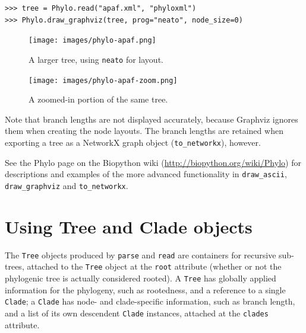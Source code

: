 \documentclass{report}
\begin{document}
\begin{verbatim}
>>> tree = Phylo.read("apaf.xml", "phyloxml")
>>> Phylo.draw_graphviz(tree, prog="neato", node_size=0)
\end{verbatim}

\begin{htmlonly}
\label{fig:phylo-apaf}

\label{fig:phylo-apaf-zoom}
\end{htmlonly}

\begin{latexonly}
  \begin{figure}[tbp]
    \centering
    \texttt{[image: images/phylo-apaf.png]} \\
    \caption{A larger tree, using {\tt neato} for layout.}
    \label{fig:phylo-apaf}
  \end{figure}
  \begin{figure}[btp]
    \centering
    \texttt{[image: images/phylo-apaf-zoom.png]}
    \caption{A zoomed-in portion of the same tree.}
    \label{fig:phylo-apaf-zoom}
  \end{figure}
\end{latexonly}

Note that branch lengths are not displayed accurately, because Graphviz ignores them when
creating the node layouts. The branch lengths are retained when exporting a tree as a NetworkX
graph object (\verb|to_networkx|), however.

See the Phylo page on the Biopython wiki (\url{http://biopython.org/wiki/Phylo}) for
descriptions and examples of the more advanced functionality in \verb|draw_ascii|,
\verb|draw_graphviz| and \verb|to_networkx|.


\section{Using Tree and Clade objects}

The \verb|Tree| objects produced by \verb|parse| and \verb|read| are containers for recursive
sub-trees, attached to the \verb|Tree| object at the \verb|root| attribute (whether or not the
phylogenic tree is actually considered rooted). A \verb|Tree| has globally applied information
for the phylogeny, such as rootedness, and a reference to a single \verb|Clade|; a
\verb|Clade| has node- and clade-specific information, such as branch length, and a list of
its own descendent \verb|Clade| instances, attached at the \verb|clades| attribute.
\end{document}
